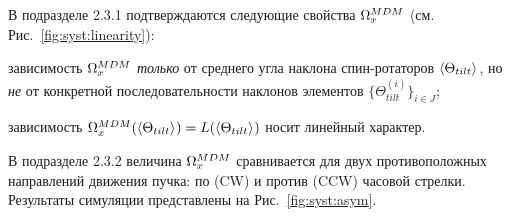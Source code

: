 В подразделе 2.3.1 подтверждаются следующие свойства $\Omega_x^{MDM}$ (см. Рис.~\ref{fig:syst:linearity}):
\begin{enumerate*}[(1)]
	\item зависимость $\Omega_x^{MDM}$ \emph{только} от среднего угла наклона спин-ротаторов $\avg{\Theta_{tilt}}$, 
	но \emph{не} от конкретной последовательности наклонов элементов $\{\Theta_{tilt}^{(i)}\}_{i\in J}$;
	\item зависимость $\W_x^{MDM}(\avg{\Theta_{tilt}}) = L(\avg{\Theta_{tilt}})$ носит линейный характер.
\end{enumerate*}

В подразделе 2.3.2 величина $\Omega_x^{MDM}$ сравнивается для двух противоположных направлений движения пучка:
по (CW) и против (CCW) часовой стрелки. Результаты симуляции представлены на Рис.~\ref{fig:syst:asym}.
